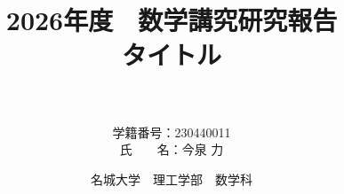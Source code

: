\title{\LARGE 2026年度　数学講究研究報告\\\vspace{1.5cm}
タイトル\\ %
{\huge　\\} \vspace{7cm}}
\author{
 \LARGE
 \centering
  \begin{tabular}{ll}
   学籍番号：230440011 \\  %
   氏　　名：今泉 力  %
  \end{tabular}
}
\date{\vspace{1.5cm} \Large 名城大学　理工学部　数学科}
\pagestyle{empty}
\maketitle
